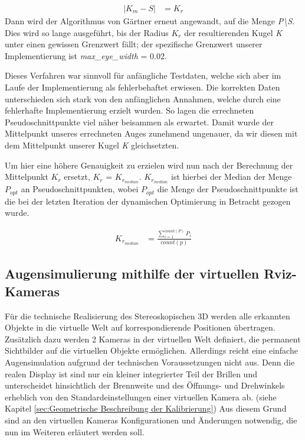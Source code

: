 \begin{align}
| K_m - S | &= K_r
\end{align} Dann wird der Algorithmus von Gärtner erneut angewandt, auf die Menge \emph{P\textbackslash S}. Dies wird so lange ausgeführt, bis
der Radius $K_r$ der resultierenden Kugel \emph{K} unter einen gewissen Grenzwert fällt; der spezifische Grenzwert unserer Implementierung ist \emph{max\_eye\_width} = 0.02.

Dieses Verfahren war sinnvoll für anfängliche Testdaten, welche sich aber im Laufe der Implementierung als fehlerbehaftet erwiesen. Die korrekten Daten unterschieden sich stark von den anfänglichen Annahmen, welche durch eine fehlerhafte Implementierung erzielt wurden. So lagen die errechneten Pseudoschnittpunkte viel näher beisammen als erwartet. Damit wurde der Mittelpunkt unseres errechneten Auges zunehmend ungenauer, da wir diesen mit dem Mittelpunkt
unserer Kugel \emph{K} gleichsetzten.

Um hier eine höhere Genauigkeit zu erzielen wird nun nach der Berechnung der Mittelpunkt $K_r$ ersetzt, $K_r$ = $K_{r_{median}}$. $K_{r_{median}}$ ist hierbei der Median der Menge $P_{opt}$ an Pseudoschnittpunkten, wobei $P_{opt}$ die Menge der Pseudoschnittpunkte ist die bei der letzten Iteration der dynamischen Optimierung in Betracht gezogen wurde.


\begin{align}
K_{r_{median}} &= \frac{\sum\limits_{i=1}^{count(P)} P_i}{count(p)} 
\end{align}

\subsection{Augensimulierung mithilfe der virtuellen Rviz-Kameras }
Für die technische Realisierung des Stereoskopischen 3D werden alle erkannten Objekte in die virtuelle Welt auf korrespondierende Positionen übertragen. 
Zusätzlich dazu werden 2 Kameras in der virtuellen Welt definiert, die permanent Sichtbilder auf die virtuellen Objekte ermöglichen. Allerdings reicht eine einfache Augensimulation aufgrund der technischen Voraussetzungen nicht aus. 
Denn die realen Display ist sind nur ein kleiner integrierter Teil der Brillen und unterscheidet hinsichtlich der Brennweite und des Öffnungs- und Drehwinkels erheblich von den Standardeinstellungen einer virtuellen Kamera ab. (siehe Kapitel \ref{sec:Geometrische Beschreibung der Kalibrierung})
Aus diesem Grund sind an den virtuellen Kameras Konfigurationen und Änderungen notwendig, die nun im Weiteren erläutert werden soll. 



